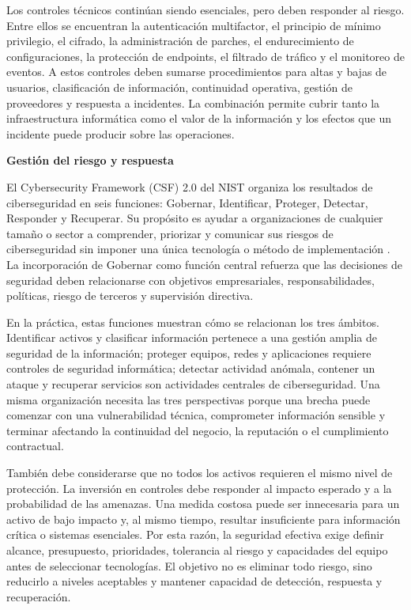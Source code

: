 \documentclass[12pt,letterpaper]{article}
\begin{document}
Los controles técnicos continúan siendo esenciales, pero deben responder al riesgo. Entre ellos se encuentran la autenticación multifactor, el principio de mínimo privilegio, el cifrado, la administración de parches, el endurecimiento de configuraciones, la protección de endpoints, el filtrado de tráfico y el monitoreo de eventos. A estos controles deben sumarse procedimientos para altas y bajas de usuarios, clasificación de información, continuidad operativa, gestión de proveedores y respuesta a incidentes. La combinación permite cubrir tanto la infraestructura informática como el valor de la información y los efectos que un incidente puede producir sobre las operaciones.

\textbf{Gestión del riesgo y respuesta}

El Cybersecurity Framework (CSF) 2.0 del NIST organiza los resultados de ciberseguridad en seis funciones: Gobernar, Identificar, Proteger, Detectar, Responder y Recuperar. Su propósito es ayudar a organizaciones de cualquier tamaño o sector a comprender, priorizar y comunicar sus riesgos de ciberseguridad sin imponer una única tecnología o método de implementación \parencite{pascoe2024csf}. La incorporación de Gobernar como función central refuerza que las decisiones de seguridad deben relacionarse con objetivos empresariales, responsabilidades, políticas, riesgo de terceros y supervisión directiva.

En la práctica, estas funciones muestran cómo se relacionan los tres ámbitos. Identificar activos y clasificar información pertenece a una gestión amplia de seguridad de la información; proteger equipos, redes y aplicaciones requiere controles de seguridad informática; detectar actividad anómala, contener un ataque y recuperar servicios son actividades centrales de ciberseguridad. Una misma organización necesita las tres perspectivas porque una brecha puede comenzar con una vulnerabilidad técnica, comprometer información sensible y terminar afectando la continuidad del negocio, la reputación o el cumplimiento contractual.

También debe considerarse que no todos los activos requieren el mismo nivel de protección. La inversión en controles debe responder al impacto esperado y a la probabilidad de las amenazas. Una medida costosa puede ser innecesaria para un activo de bajo impacto y, al mismo tiempo, resultar insuficiente para información crítica o sistemas esenciales. Por esta razón, la seguridad efectiva exige definir alcance, presupuesto, prioridades, tolerancia al riesgo y capacidades del equipo antes de seleccionar tecnologías. El objetivo no es eliminar todo riesgo, sino reducirlo a niveles aceptables y mantener capacidad de detección, respuesta y recuperación.
\end{document}
